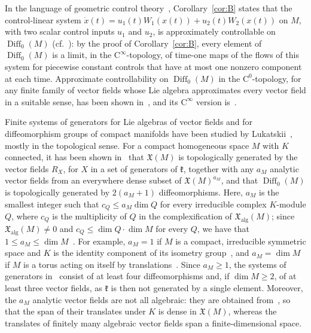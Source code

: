 \documentclass{article}
\newcommand{\frakk}{\mathfrak{k}}
\newcommand{\xalg}{\mathfrak X_{\mathrm{alg}}}
\theoremstyle{definition}
\theoremstyle{plain}
\begin{document}
In the language of geometric control theory~\cite{AS22,AK26}, Corollary~\ref{cor:B} states that the control-linear system $\dot x(t)=u_1(t)W_1(x(t))+u_2(t)W_2(x(t))$ on $M$, with two scalar control inputs $u_1$ and $u_2$, is approximately controllable on $\operatorname{Diff}_0(M)$ (cf.~\cite[Definition~1]{AK26}): by the proof of Corollary~\ref{cor:B}, every element of $\operatorname{Diff}_0(M)$ is a limit, in the $\mathrm{C}^\infty$-topology, of time-one maps of the flows of this system for piecewise constant controls that have at most one nonzero component at each time.
Approximate controllability on $\operatorname{Diff}_0(M)$ in the $\mathrm{C}^0$-topology, for any finite family of vector fields whose Lie algebra approximates every vector field in a suitable sense, has been shown in~\cite[Theorem~5.1]{AS22},
    and its $\mathrm{C}^\infty$ version is~\cite[Proposition~1 and Remark~1]{AK26}.



Finite systems of generators for Lie algebras of vector fields and for diffeomorphism groups of compact manifolds have been studied by Lukatskii~\cite{Luk74,Luk75Dokl,Luk75Izv,Luk77,Luk78,Luk79,Luk81}, mostly in the topological sense.
For a compact homogeneous space $M$ with $K$ connected, it has been shown in~\cite[Theorem~2]{Luk75Izv} that $\mathfrak X(M)$ is topologically generated by the vector fields $R_X$, for $X$ in a set of generators of $\frakk$, together with any $a_M$ analytic vector fields from an everywhere dense subset of $\mathfrak X(M)^{a_M}$, and that $\operatorname{Diff}_0(M)$ is topologically generated by $2(a_M+1)$ diffeomorphisms.
 Here, $a_M$ is the smallest integer such that $c_Q \leq  a_M\dim Q$ for every irreducible complex $K$-module $Q$, where $c_Q$ is the multiplicity of $Q$ in the complexification of $\xalg(M)$; since $\xalg(M)\neq0$ and $c_Q \leq \dim Q\cdot\dim M$ for every $Q$, we have that $1\leq a_M\leq\dim M$~\cite[p.~1204]{Luk75Izv}.
For example, $a_M=1$ if $M$ is a compact, irreducible symmetric space and $K$ is the identity component of its isometry group~\cite[pp.~1206--1207]{Luk75Izv}, and $a_M=\dim M$ if $M$ is a torus acting on itself by translations~\cite[p.~1212]{Luk75Izv}.
Since $a_M\geq1$, the systems of generators in~\cite[Theorem~2]{Luk75Izv} consist of at least four diffeomorphisms and, if $\dim M\geq2$, of at least three vector fields, as $\frakk$ is then not generated by a single element.
Moreover, the $a_M$ analytic vector fields are not all algebraic: they are obtained from~\cite[Theorem~1]{Luk75Izv}, so that the span of their translates under $K$ is dense in $\mathfrak X(M)$, whereas the translates of finitely many algebraic vector fields span a finite-dimensional space.
\end{document}
